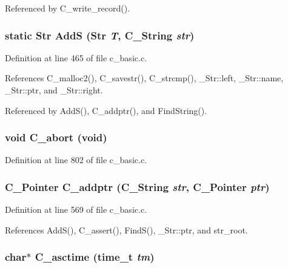 Referenced by C\_\-write\_\-record().
\subsubsection{\setlength{\rightskip}{0pt plus 5cm}static \bf{Str} Add\-S (\bf{Str} {\em T}, \bf{C\_\-String} {\em str})\hspace{0.3cm}{\tt  [static]}}\label{c__basic_8c_1eb44da9131bba892858a7c019cc65ba}




Definition at line 465 of file c\_\-basic.c.

References C\_\-malloc2(), C\_\-savestr(), C\_\-strcmp(), \_\-Str::left, \_\-Str::name, \_\-Str::ptr, and \_\-Str::right.

Referenced by Add\-S(), C\_\-addptr(), and Find\-String().
\subsubsection{\setlength{\rightskip}{0pt plus 5cm}void C\_\-abort (void)}\label{c__basic_8c_444d03c8c0836229e6050011309e10d5}




Definition at line 802 of file c\_\-basic.c.
\subsubsection{\setlength{\rightskip}{0pt plus 5cm}\bf{C\_\-Pointer} C\_\-addptr (\bf{C\_\-String} {\em str}, \bf{C\_\-Pointer} {\em ptr})}\label{c__basic_8c_a50d24783916012cb1b76e6a098d0dc6}




Definition at line 569 of file c\_\-basic.c.

References Add\-S(), C\_\-assert(), Find\-S(), \_\-Str::ptr, and str\_\-root.
\subsubsection{\setlength{\rightskip}{0pt plus 5cm}char$\ast$ C\_\-asctime (time\_\-t {\em tm})}\label{c__basic_8c_7d927796c56a2a830032ce234e68ab5d}




